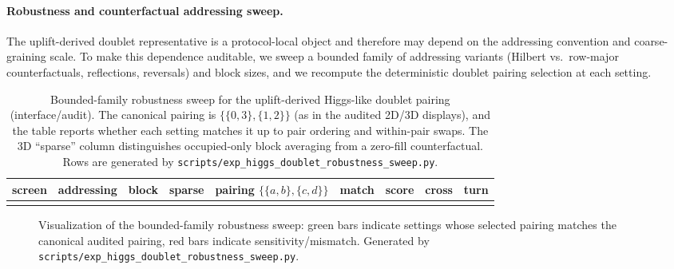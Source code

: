 \paragraph{Robustness and counterfactual addressing sweep.}
\AuditTag The uplift-derived doublet representative is a protocol-local object and therefore may depend on the addressing convention and coarse-graining scale.
To make this dependence auditable, we sweep a bounded family of addressing variants (Hilbert vs.\ row-major counterfactuals, reflections, reversals) and block sizes, and we recompute the deterministic doublet pairing selection at each setting.
%

\begin{table}[t]
\centering
\scriptsize
\setlength{\tabcolsep}{6pt}
\renewcommand{\arraystretch}{1.10}
\begin{tabular}{l l r l l c r r r}
\toprule
screen & addressing & block & sparse & pairing $\{\{a,b\},\{c,d\}\}$ & match & score & cross & turn \\
\midrule
%
\\
\bottomrule
\end{tabular}
\caption{Bounded-family robustness sweep for the uplift-derived Higgs-like doublet pairing (interface/audit). The canonical pairing is $\{\{0,3\},\{1,2\}\}$ (as in the audited 2D/3D displays), and the table reports whether each setting matches it up to pair ordering and within-pair swaps. The 3D ``sparse'' column distinguishes occupied-only block averaging from a zero-fill counterfactual. Rows are generated by \texttt{scripts/exp\_higgs\_doublet\_robustness\_sweep.py}.}
\label{tab:higgs_doublet_robustness_sweep}
\end{table}

\begin{figure}[t]
\centering
{}
\caption{Visualization of the bounded-family robustness sweep: green bars indicate settings whose selected pairing matches the canonical audited pairing, red bars indicate sensitivity/mismatch. Generated by \texttt{scripts/exp\_higgs\_doublet\_robustness\_sweep.py}.}
\label{fig:higgs_doublet_robustness_sweep}
\end{figure}


